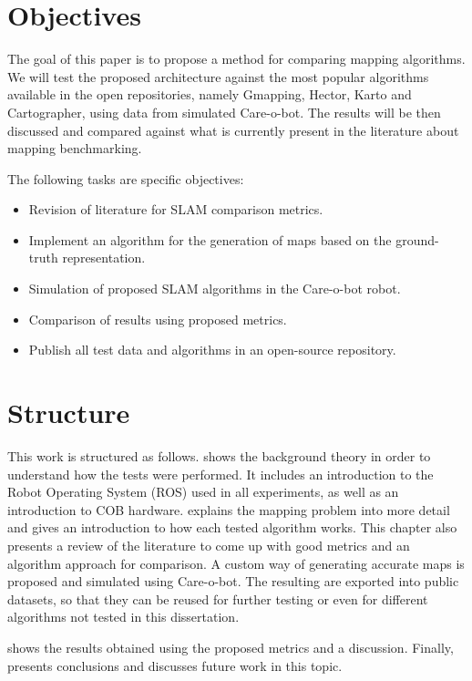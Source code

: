 \section{Objectives}

The goal of this paper is to propose a method for comparing mapping algorithms. We will test the proposed architecture against the most popular algorithms available in the open repositories, namely Gmapping, Hector, Karto and Cartographer, using data from simulated Care-o-bot. The results will be then discussed and compared against what is currently present in the literature about mapping benchmarking. 

The following tasks are specific objectives:

\begin{itemize}
    \item Revision of literature for SLAM comparison metrics.
    \item Implement an algorithm for the generation of maps based on the ground-truth representation.
    \item Simulation of proposed SLAM algorithms in the Care-o-bot robot.
    \item Comparison of results using proposed metrics.
    \item Publish all test data and algorithms in an open-source repository.
\end{itemize}


\section{Structure}

This work is structured as follows.  shows the background theory in order to understand how the tests were performed. It includes an introduction to the Robot Operating System (ROS) used in all experiments, as well as an introduction to COB hardware.  explains the mapping problem into more detail and gives an introduction to how each tested algorithm works. This chapter also presents a review of the literature to come up with good metrics and an algorithm approach for comparison. A custom way of generating accurate maps is proposed and simulated using Care-o-bot. The resulting are exported into public datasets, so that they can be reused for further testing or even for different algorithms not tested in this dissertation.

 shows the results obtained using the proposed metrics and a discussion. Finally,  presents conclusions and discusses future work in this topic.

